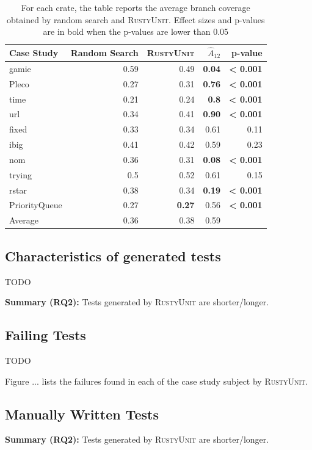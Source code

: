 \documentclass[paper=a4,%
  twoside,%
  BCOR4mm,%
  abstract=true,%
  toc=bibliography,%
  chapterprefix=true,%
  toc=bibliographynumbered,%
  open=right,%
  english,%
  pagesize=pdftex]{scrreprt}
\newcommand{\tech}{\textsc{RustyUnit}\xspace}
\begin{document}
\begin{table}[]
  \begin{tabular*}{\textwidth}{l @{\extracolsep{\fill}} rrrr}
  \hline
  \textbf{Case Study} & Random Search & \tech & \textbf{$\hat{A}_{12}$} & p-value \\
  \hline
  gamie & 0.59 & 0.49 & \textbf{0.04} & \textbf{< 0.001} \\
  Pleco & 0.27 & 0.31 & \textbf{0.76} & \textbf{< 0.001} \\
  time & 0.21 & 0.24 & \textbf{0.8} & \textbf{< 0.001} \\
  url & 0.34 & 0.41 & \textbf{0.90} & \textbf{< 0.001} \\
  fixed & 0.33 & 0.34 & 0.61 & 0.11 \\
  ibig & 0.41 & 0.42 & 0.59 & 0.23 \\
  nom & 0.36 & 0.31 & \textbf{0.08} & \textbf{< 0.001} \\
  trying & 0.5 & 0.52 & 0.61 & 0.15 \\
  rstar & 0.38 & 0.34 & \textbf{0.19} & \textbf{< 0.001} \\
  PriorityQueue & 0.27 & \textbf{0.27} & 0.56 & \textbf{< 0.001} \\
  \hline
  Average & 0.36 & 0.38 & 0.59 & \\
  \hline
  \end{tabular*}
\caption{\label{tab:results-ru-rs-coverage}For each crate, the table reports the average branch coverage obtained by random search and \tech. Effect sizes and p-values are in bold when the p-values are lower than 0.05}
\end{table}


\subsection{Characteristics of generated tests}
TODO 
\begin{tcolorbox}
\textbf{Summary (RQ2):} Tests generated by \tech are shorter/longer. 
\end{tcolorbox}

\subsection{Failing Tests}
TODO 

Figure ... lists the failures found in each of the case study subject by \tech. 

\subsection{Manually Written Tests}
\begin{tcolorbox}
\textbf{Summary (RQ2):} Tests generated by \tech are shorter/longer. 
\end{tcolorbox}
\end{document}
